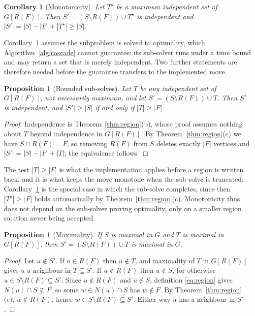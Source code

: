 \documentclass[review,authoryear,11pt]{elsarticle}
\newtheorem{corollary}[theorem]{Corollary}
\newtheorem{proposition}[theorem]{Proposition}
\theoremstyle{definition}
\begin{document}
\begin{corollary}[Monotonicity]
\label{cor:monotone}
Let $T^\star$ be a maximum independent set of $G[R(F)]$. Then
$S' = (S \setminus R(F)) \cup T^\star$ is independent and
$|S'| = |S| - |F| + |T^\star| \ge |S|$.
\end{corollary}

Corollary~\ref{cor:monotone} assumes the subproblem is solved to optimality,
which Algorithm~\ref{alg:cascade} cannot guarantee: its sub-solver runs under a
time bound and may return a set that is merely independent. Two further
statements are therefore needed before the guarantee transfers to the
implemented move.

\begin{proposition}[Bounded sub-solves]
\label{prop:bounded}
Let $T$ be any independent set of $G[R(F)]$, not necessarily maximum, and let
$S' = (S \setminus R(F)) \cup T$. Then $S'$ is independent, and
$|S'| \ge |S|$ if and only if $|T| \ge |F|$.
\end{proposition}

\begin{proof}
Independence is Theorem~\ref{thm:region}(b), whose proof assumes nothing about
$T$ beyond independence in $G[R(F)]$. By Theorem~\ref{thm:region}(c) we have
$S \cap R(F) = F$, so removing $R(F)$ from $S$ deletes exactly $|F|$ vertices and
$|S'| = |S| - |F| + |T|$; the equivalence follows.
\end{proof}

The test $|T| \ge |F|$ is what the implementation applies before a region is
written back, and it is what keeps the move monotone when the sub-solve is
truncated; Corollary~\ref{cor:monotone} is the special case in which the
sub-solve completes, since then $|T^\star| \ge |F|$ holds automatically by
Theorem~\ref{thm:region}(c). Monotonicity thus does not depend on the sub-solver
proving optimality, only on a smaller region solution never being accepted.

\begin{proposition}[Maximality]
\label{prop:maximal}
If $S$ is maximal in $G$ and $T$ is maximal in $G[R(F)]$, then
$S' = (S \setminus R(F)) \cup T$ is maximal in $G$.
\end{proposition}

\begin{proof}
Let $u \notin S'$. If $u \in R(F)$ then $u \notin T$, and maximality of $T$ in
$G[R(F)]$ gives $u$ a neighbour in $T \subseteq S'$. If $u \notin R(F)$ then
$u \notin S$, for otherwise $u \in S \setminus R(F) \subseteq S'$. Since
$u \notin R(F)$ and $u \notin S$, definition \eqref{eq:region} gives
$N(u) \cap S \not\subseteq F$, so some $w \in N(u) \cap S$ has $w \notin F$. By
Theorem~\ref{thm:region}(c), $w \notin R(F)$, hence
$w \in S \setminus R(F) \subseteq S'$. Either way $u$ has a neighbour in $S'$.
\end{proof}
\end{document}

